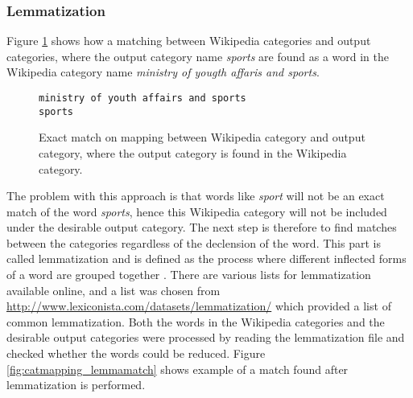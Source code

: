 



\subsubsection{Lemmatization}

Figure \ref{fig:catmapping_exactmatch} shows how a matching between Wikipedia categories and output categories, where the output category name \emph{sports} are found as a word in the Wikipedia category name \emph{ministry of yougth affaris and sports}.

\begin{figure}[h]
\centering
\begin{lstlisting}
ministry of youth affairs and sports
sports
\end{lstlisting}
\caption[Exact match on mapping between Wikipedia category and output category]{Exact match on mapping between Wikipedia category and output category, where the output category is found in the Wikipedia category.}
\label{fig:catmapping_exactmatch}
\end{figure}
The problem with this approach is that words like \emph{sport} will not be an exact match of the word \emph{sports}, hence this Wikipedia category will not be included under the desirable output category. The next step is therefore to find matches between the categories regardless of the declension of the word. This part is called lemmatization and is defined as the process where different inflected forms of a word are grouped together \cite{wiki:lemmatisation}\cite[p.~30-33]{iirbook}. There are various lists for lemmatization available online, and a list was chosen from  \url{http://www.lexiconista.com/datasets/lemmatization/} which provided a list of common lemmatization. Both the words in the Wikipedia categories and the desirable output categories were processed by reading the lemmatization file and checked whether the words could be reduced. Figure \ref{fig:catmapping_lemmamatch} shows example of a match found after lemmatization is performed. 

